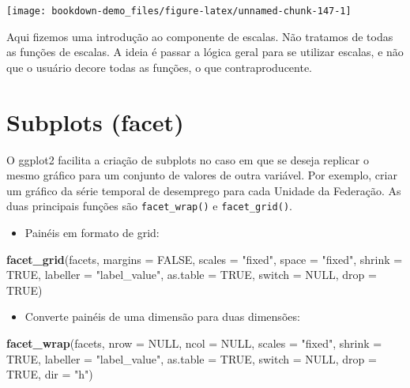 \documentclass[]{book}
\newenvironment{Shaded}{\begin{snugshade}}{\end{snugshade}}
\newcommand{\KeywordTok}[1]{\textcolor[rgb]{0.13,0.29,0.53}{\textbf{#1}}}
\newcommand{\DataTypeTok}[1]{\textcolor[rgb]{0.13,0.29,0.53}{#1}}
\newcommand{\StringTok}[1]{\textcolor[rgb]{0.31,0.60,0.02}{#1}}
\newcommand{\OtherTok}[1]{\textcolor[rgb]{0.56,0.35,0.01}{#1}}
\newcommand{\NormalTok}[1]{#1}
\providecommand{\tightlist}{%
  \setlength{\itemsep}{0pt}\setlength{\parskip}{0pt}}
\begin{document}
\begin{center}\texttt{[image: bookdown-demo\_files/figure-latex/unnamed-chunk-147-1]} \end{center}

Aqui fizemos uma introdução ao componente de escalas. Não tratamos de
todas as funções de escalas. A ideia é passar a lógica geral para se
utilizar escalas, e não que o usuário decore todas as funções, o que
contraproducente.

\section{Subplots (facet)}\label{subplots-facet}

O ggplot2 facilita a criação de subplots no caso em que se deseja
replicar o mesmo gráfico para um conjunto de valores de outra variável.
Por exemplo, criar um gráfico da série temporal de desemprego para cada
Unidade da Federação. As duas principais funções são
\texttt{facet\_wrap()} e \texttt{facet\_grid()}.

\begin{itemize}
\tightlist
\item
  Painéis em formato de grid:
\end{itemize}

\begin{Shaded}
\begin{Highlighting}[]
\KeywordTok{facet_grid}\NormalTok{(facets, }\DataTypeTok{margins =} \OtherTok{FALSE}\NormalTok{, }\DataTypeTok{scales =} \StringTok{"fixed"}\NormalTok{, }\DataTypeTok{space =} \StringTok{"fixed"}\NormalTok{, }\DataTypeTok{shrink =} \OtherTok{TRUE}\NormalTok{,}
           \DataTypeTok{labeller =} \StringTok{"label_value"}\NormalTok{, }\DataTypeTok{as.table =} \OtherTok{TRUE}\NormalTok{, }\DataTypeTok{switch =} \OtherTok{NULL}\NormalTok{, }\DataTypeTok{drop =} \OtherTok{TRUE}\NormalTok{)}
\end{Highlighting}
\end{Shaded}

\begin{itemize}
\tightlist
\item
  Converte painéis de uma dimensão para duas dimensões:
\end{itemize}

\begin{Shaded}
\begin{Highlighting}[]
\KeywordTok{facet_wrap}\NormalTok{(facets, }\DataTypeTok{nrow =} \OtherTok{NULL}\NormalTok{, }\DataTypeTok{ncol =} \OtherTok{NULL}\NormalTok{, }\DataTypeTok{scales =} \StringTok{"fixed"}\NormalTok{, }\DataTypeTok{shrink =} \OtherTok{TRUE}\NormalTok{,}
           \DataTypeTok{labeller =} \StringTok{"label_value"}\NormalTok{, }\DataTypeTok{as.table =} \OtherTok{TRUE}\NormalTok{, }\DataTypeTok{switch =} \OtherTok{NULL}\NormalTok{, }\DataTypeTok{drop =} \OtherTok{TRUE}\NormalTok{,}
           \DataTypeTok{dir =} \StringTok{"h"}\NormalTok{)}
\end{Highlighting}
\end{Shaded}
\end{document}
